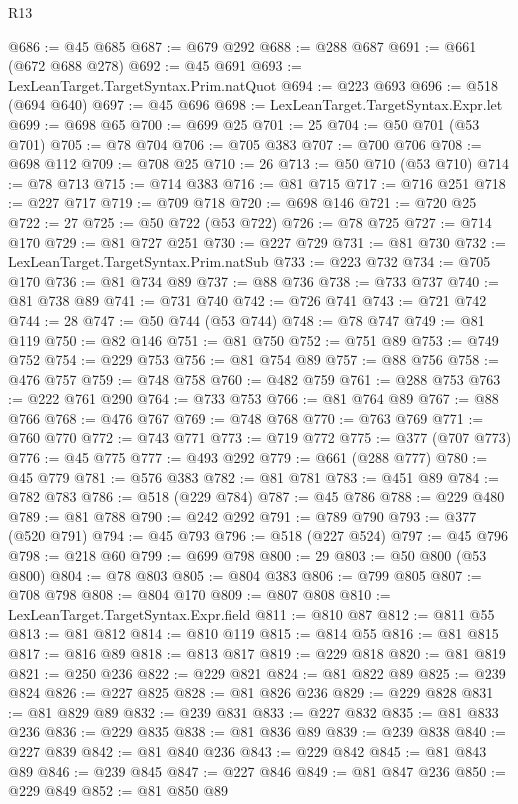 \begin{lexlean}{R13}
\begin{coremodule}
@686 := @45 @685
@687 := @679 @292
@688 := @288 @687
@691 := @661 (@672 @688 @278)
@692 := @45 @691
@693 := LexLeanTarget.TargetSyntax.Prim.natQuot
@694 := @223 @693
@696 := @518 (@694 @640)
@697 := @45 @696
@698 := LexLeanTarget.TargetSyntax.Expr.let
@699 := @698 @65
@700 := @699 @25
@701 := 25
@704 := @50 @701 (@53 @701)
@705 := @78 @704
@706 := @705 @383
@707 := @700 @706
@708 := @698 @112
@709 := @708 @25
@710 := 26
@713 := @50 @710 (@53 @710)
@714 := @78 @713
@715 := @714 @383
@716 := @81 @715
@717 := @716 @251
@718 := @227 @717
@719 := @709 @718
@720 := @698 @146
@721 := @720 @25
@722 := 27
@725 := @50 @722 (@53 @722)
@726 := @78 @725
@727 := @714 @170
@729 := @81 @727 @251
@730 := @227 @729
@731 := @81 @730
@732 := LexLeanTarget.TargetSyntax.Prim.natSub
@733 := @223 @732
@734 := @705 @170
@736 := @81 @734 @89
@737 := @88 @736
@738 := @733 @737
@740 := @81 @738 @89
@741 := @731 @740
@742 := @726 @741
@743 := @721 @742
@744 := 28
@747 := @50 @744 (@53 @744)
@748 := @78 @747
@749 := @81 @119
@750 := @82 @146
@751 := @81 @750
@752 := @751 @89
@753 := @749 @752
@754 := @229 @753
@756 := @81 @754 @89
@757 := @88 @756
@758 := @476 @757
@759 := @748 @758
@760 := @482 @759
@761 := @288 @753
@763 := @222 @761 @290
@764 := @733 @753
@766 := @81 @764 @89
@767 := @88 @766
@768 := @476 @767
@769 := @748 @768
@770 := @763 @769
@771 := @760 @770
@772 := @743 @771
@773 := @719 @772
@775 := @377 (@707 @773)
@776 := @45 @775
@777 := @493 @292
@779 := @661 (@288 @777)
@780 := @45 @779
@781 := @576 @383
@782 := @81 @781
@783 := @451 @89
@784 := @782 @783
@786 := @518 (@229 @784)
@787 := @45 @786
@788 := @229 @480
@789 := @81 @788
@790 := @242 @292
@791 := @789 @790
@793 := @377 (@520 @791)
@794 := @45 @793
@796 := @518 (@227 @524)
@797 := @45 @796
@798 := @218 @60
@799 := @699 @798
@800 := 29
@803 := @50 @800 (@53 @800)
@804 := @78 @803
@805 := @804 @383
@806 := @799 @805
@807 := @708 @798
@808 := @804 @170
@809 := @807 @808
@810 := LexLeanTarget.TargetSyntax.Expr.field
@811 := @810 @87
@812 := @811 @55
@813 := @81 @812
@814 := @810 @119
@815 := @814 @55
@816 := @81 @815
@817 := @816 @89
@818 := @813 @817
@819 := @229 @818
@820 := @81 @819
@821 := @250 @236
@822 := @229 @821
@824 := @81 @822 @89
@825 := @239 @824
@826 := @227 @825
@828 := @81 @826 @236
@829 := @229 @828
@831 := @81 @829 @89
@832 := @239 @831
@833 := @227 @832
@835 := @81 @833 @236
@836 := @229 @835
@838 := @81 @836 @89
@839 := @239 @838
@840 := @227 @839
@842 := @81 @840 @236
@843 := @229 @842
@845 := @81 @843 @89
@846 := @239 @845
@847 := @227 @846
@849 := @81 @847 @236
@850 := @229 @849
@852 := @81 @850 @89

\end{coremodule}
\end{lexlean}
